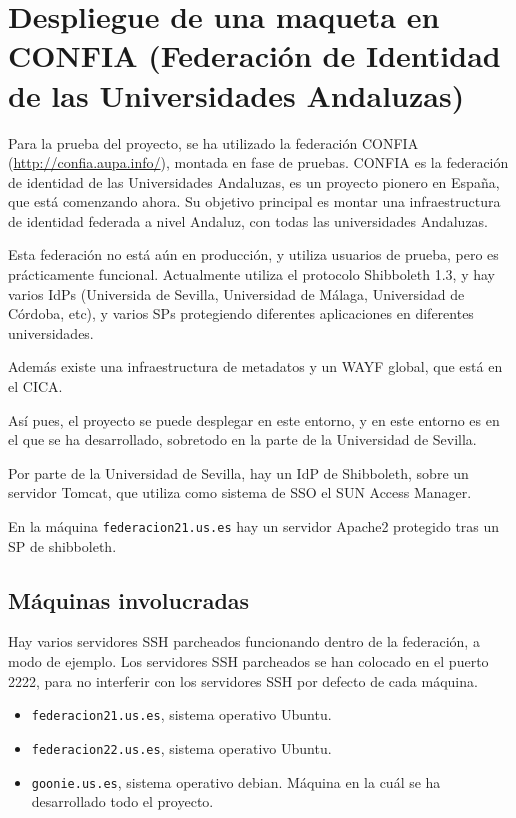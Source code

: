 \chapter{Despliegue de una maqueta en CONFIA (Federación de Identidad de las Universidades Andaluzas)}

    Para la prueba del proyecto, se ha utilizado la federación CONFIA
    (\url{http://confia.aupa.info/}),
    montada en fase de pruebas. CONFIA es la federación de identidad de las
    Universidades Andaluzas, es un proyecto pionero en España, que está
    comenzando ahora. Su objetivo principal es montar una infraestructura
    de identidad federada a nivel Andaluz, con todas las universidades
    Andaluzas.

    Esta federación no está aún en producción, y utiliza usuarios de
    prueba, pero es prácticamente funcional. Actualmente utiliza el
    protocolo Shibboleth 1.3, y hay varios IdPs (Universida de Sevilla,
    Universidad de Málaga, Universidad de Córdoba, etc), y varios SPs
    protegiendo diferentes aplicaciones en diferentes universidades.

    Además existe una infraestructura de metadatos y un WAYF global, que está
    en el CICA.

    Así pues, el proyecto se puede desplegar en este entorno, y en este
    entorno es en el que se ha desarrollado, sobretodo en la parte de la
    Universidad de Sevilla.

    Por parte de la Universidad de Sevilla, hay un IdP de Shibboleth, sobre
    un servidor Tomcat, que utiliza como sistema de SSO el SUN Access
    Manager.


    En la máquina \texttt{federacion21.us.es} hay un servidor Apache2
    protegido tras un SP de shibboleth.

\section{Máquinas involucradas}

    Hay varios servidores SSH parcheados funcionando dentro de la
    federación, a modo de ejemplo. Los servidores SSH parcheados se han
    colocado en el puerto 2222, para no interferir con los servidores SSH
    por defecto de cada máquina.

    \begin{itemize}

    \item \texttt{federacion21.us.es}, sistema operativo Ubuntu.
    \item \texttt{federacion22.us.es}, sistema operativo Ubuntu.
    \item \texttt{goonie.us.es}, sistema operativo debian. Máquina en la
    cuál se ha desarrollado todo el proyecto.

    \end{itemize}

